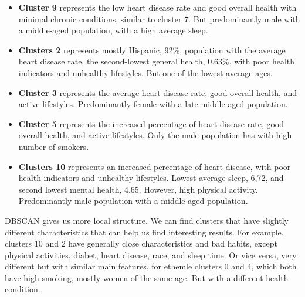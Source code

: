 \documentclass[12pt, a4paper]{article}
\begin{document}
\begin{itemize}
\item \textbf{Cluster 9} represents the low heart disease rate and good overall health with minimal chronic conditions, similar to cluster 7. But predominantly male with a middle-aged population, with a high average sleep.
\item \textbf{Clusters 2} represents mostly  Hispanic, 92\%, population with the average heart disease rate, the second-lowest general health, 0.63\%, with poor health indicators and unhealthy lifestyles. But one of the lowest average ages.
\item \textbf{Cluster 3} represents the average heart disease rate, good overall health, and active lifestyles. Predominantly female with a late middle-aged population.
\item \textbf{Cluster 5} represents the increased percentage of heart disease rate, good overall health, and active lifestyles. Only the male population has with high number of smokers.
\item \textbf{Clusters 10}  represents an increased percentage of heart disease, with poor health indicators and unhealthy lifestyles. Lowest average sleep, 6,72, and second lowest mental health, 4.65. However, high physical activity. Predominantly male population with a middle-aged population.
\end{itemize}
 
DBSCAN gives us more local structure. We can find clusters that have slightly different characteristics that can help us find interesting results. For example, clusters 10 and 2 have generally close characteristics and bad habits, except physical activities, diabet, heart disease, race, and sleep time. Or vice versa, very different but with similar main features, for ethemle clusters 0 and 4, which both have high smoking, mostly women of the same age. But with a different health condition. 
\end{document}
